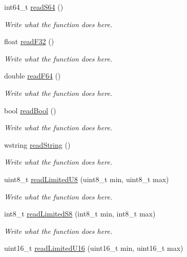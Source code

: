 \begin{DoxyCompactItemize}
int64\+\_\+t \hyperlink{classReader_a8fb79b338f1bbe922a0920de54159359}{read\+S64} ()
\begin{DoxyCompactList}\small\item\em Write what the function does here. \end{DoxyCompactList}\item 
float \hyperlink{classReader_ab3fb66624bda780998e0ee473a45aa0e}{read\+F32} ()
\begin{DoxyCompactList}\small\item\em Write what the function does here. \end{DoxyCompactList}\item 
double \hyperlink{classReader_a9b0ac08b982653c1ba0f6dea7e097581}{read\+F64} ()
\begin{DoxyCompactList}\small\item\em Write what the function does here. \end{DoxyCompactList}\item 
bool \hyperlink{classReader_a76fb2bc2291445a0bf1cc924e163c7f1}{read\+Bool} ()
\begin{DoxyCompactList}\small\item\em Write what the function does here. \end{DoxyCompactList}\item 
wstring \hyperlink{classReader_a4c128181d159e7581b89aa796a8de7ab}{read\+String} ()
\begin{DoxyCompactList}\small\item\em Write what the function does here. \end{DoxyCompactList}\item 
uint8\+\_\+t \hyperlink{classReader_a2996e5e74c4494fc7ae2b672fff05eb2}{read\+Limited\+U8} (uint8\+\_\+t min, uint8\+\_\+t max)
\begin{DoxyCompactList}\small\item\em Write what the function does here. \end{DoxyCompactList}\item 
int8\+\_\+t \hyperlink{classReader_aa21aee941e21f17643e826a30ba025cf}{read\+Limited\+S8} (int8\+\_\+t min, int8\+\_\+t max)
\begin{DoxyCompactList}\small\item\em Write what the function does here. \end{DoxyCompactList}\item 
uint16\+\_\+t \hyperlink{classReader_ab99b9b57b69552db10657969d3c7730e}{read\+Limited\+U16} (uint16\+\_\+t min, uint16\+\_\+t max)

\end{DoxyCompactItemize}
